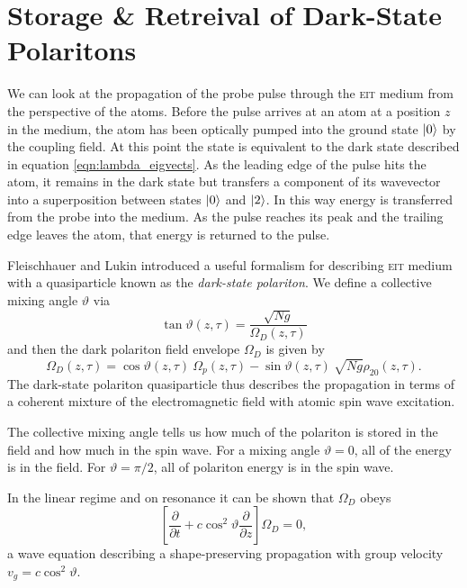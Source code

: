 \section{Storage \& Retreival of Dark-State Polaritons}
  \label{sec:polaritons_storage}

    We can look at the propagation of the probe pulse through the \textsc{eit}
    medium from the perspective of the atoms. Before the pulse arrives at an
    atom at a position $z$ in the medium, the atom has been optically pumped
    into the ground state $\Ket{0}$ by the coupling field. At this point the
    state is equivalent to the dark state described in equation
    \ref{eqn:lambda_eigvects}. As the leading edge of the pulse hits the atom,
    it remains in the dark state but transfers a component of its wavevector
    into a superposition between states $\Ket{0}$ and $\Ket{2}$. In this way
    energy is transferred from the probe into the medium. As the pulse reaches
    its peak and the trailing edge leaves the atom, that energy is returned to
    the pulse.

    Fleischhauer and Lukin\cite{Fleischhauer2000} introduced a useful formalism
    for describing \textsc{eit} medium with a quasiparticle known as the \textit
    {dark-state polariton}. We define a collective mixing angle $\vartheta$ via
    \begin{equation}
      \tan{\vartheta}(z, \tau) = \frac{\sqrt{Ng}}{\Omega_D(z, \tau)}
    \end{equation}
    and then the dark polariton field envelope $\Omega_D$ is given by
    \begin{equation}
      \Omega_D(z,\tau) = \cos{\vartheta}(z, \tau)~\Omega_p(z, \tau) - 
        \sin{\vartheta}(z, \tau) ~ \sqrt{Ng} \rho_{20}(z, \tau).
    \end{equation}
    The dark-state polariton quasiparticle thus describes the propagation in
    terms of a coherent mixture of the electromagnetic field with atomic spin
    wave excitation. 

    The collective mixing angle tells us how much of the polariton is stored in
    the field and how much in the spin wave. For a mixing angle $\vartheta = 0$,
    all of the energy is in the field. For $\vartheta = \pi/2$, all of polariton
    energy is in the spin wave.
    
    In the linear regime and on resonance it can be shown\cite{lambropoulos2007fundamentals} that
    $\Omega_D$ obeys 
    \begin{equation}
      \left[ \frac{\partial}{\partial t} + c \cos^2 \vartheta 
      \frac{\partial}{\partial z} \right] \Omega_D = 0,
    \end{equation}
    a wave equation describing a shape-preserving propagation with group
    velocity $v_g = c \cos^2 \vartheta$.

